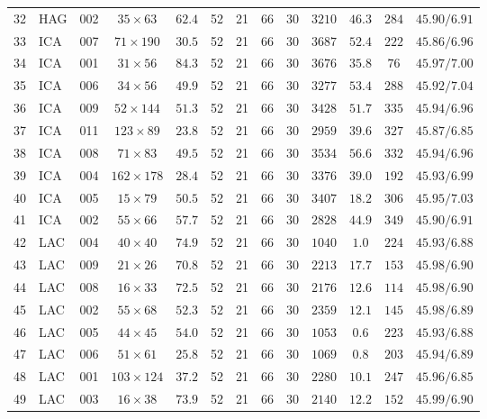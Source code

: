 \begin{table}[H]
{\begin{NiceTabular}{llccccccccccc}
32 & HAG & 002 & $35 \times 63$ & $62.4$ & 52 & 21 & 66 & 30 & $3210$ & $46.3$ & $284$ & $45.90/6.91$ \\
33 & ICA & 007 & $71 \times 190$ & $30.5$ & 52 & 21 & 66 & 30 & $3687$ & $52.4$ & $222$ & $45.86/6.96$ \\
34 & ICA & 001 & $31 \times 56$ & $84.3$ & 52 & 21 & 66 & 30 & $3676$ & $35.8$ & $76$ & $45.97/7.00$ \\
35 & ICA & 006 & $34 \times 56$ & $49.9$ & 52 & 21 & 66 & 30 & $3277$ & $53.4$ & $288$ & $45.92/7.04$ \\
36 & ICA & 009 & $52 \times 144$ & $51.3$ & 52 & 21 & 66 & 30 & $3428$ & $51.7$ & $335$ & $45.94/6.96$ \\
37 & ICA & 011 & $123 \times 89$ & $23.8$ & 52 & 21 & 66 & 30 & $2959$ & $39.6$ & $327$ & $45.87/6.85$ \\
38 & ICA & 008 & $71 \times 83$ & $49.5$ & 52 & 21 & 66 & 30 & $3534$ & $56.6$ & $332$ & $45.94/6.96$ \\
39 & ICA & 004 & $162 \times 178$ & $28.4$ & 52 & 21 & 66 & 30 & $3376$ & $39.0$ & $192$ & $45.93/6.99$ \\
40 & ICA & 005 & $15 \times 79$ & $50.5$ & 52 & 21 & 66 & 30 & $3407$ & $18.2$ & $306$ & $45.95/7.03$ \\
41 & ICA & 002 & $55 \times 66$ & $57.7$ & 52 & 21 & 66 & 30 & $2828$ & $44.9$ & $349$ & $45.90/6.91$ \\
42 & LAC & 004 & $40 \times 40$ & $74.9$ & 52 & 21 & 66 & 30 & $1040$ & $1.0$ & $224$ & $45.93/6.88$ \\
43 & LAC & 009 & $21 \times 26$ & $70.8$ & 52 & 21 & 66 & 30 & $2213$ & $17.7$ & $153$ & $45.98/6.90$ \\
44 & LAC & 008 & $16 \times 33$ & $72.5$ & 52 & 21 & 66 & 30 & $2176$ & $12.6$ & $114$ & $45.98/6.90$ \\
45 & LAC & 002 & $55 \times 68$ & $52.3$ & 52 & 21 & 66 & 30 & $2359$ & $12.1$ & $145$ & $45.98/6.89$ \\
46 & LAC & 005 & $44 \times 45$ & $54.0$ & 52 & 21 & 66 & 30 & $1053$ & $0.6$ & $223$ & $45.93/6.88$ \\
47 & LAC & 006 & $51 \times 61$ & $25.8$ & 52 & 21 & 66 & 30 & $1069$ & $0.8$ & $203$ & $45.94/6.89$ \\
48 & LAC & 001 & $103 \times 124$ & $37.2$ & 52 & 21 & 66 & 30 & $2280$ & $10.1$ & $247$ & $45.96/6.85$ \\
49 & LAC & 003 & $16 \times 38$ & $73.9$ & 52 & 21 & 66 & 30 & $2140$ & $12.2$ & $152$ & $45.99/6.90$ \\

\end{NiceTabular}}
\end{table}
